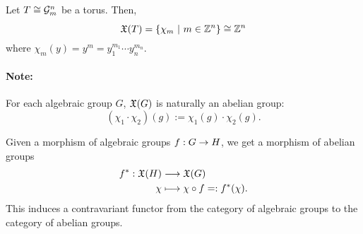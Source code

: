 \begin{example}
Let $T \overset{}{\cong} \mathcal{G}_m^n$ be a torus. Then,
\[ \mathfrak{X}(T) = \left\lbrace\chi_m ~ | ~ m \in \mathbb{Z}^n\right\rbrace \overset{}{\cong} \mathbb{Z}^n \]
where $\chi_m(y) = y^m = y_1^{m_1}\cdots y_n^{m_n}.$
\end{example}
\paragraph{Note:} For each algebraic group $G$, $\mathfrak{X}(G)$ is naturally an abelian group:
\[ (\chi_1 \cdot \chi_2)(g) := \chi_1(g) \cdot \chi_2(g). \]


Given a morphism of algebraic groups $f : G \overset{}{\rightarrow} H$, we get a morphism of abelian groups
\begin{align*}
f^* : \mathfrak{X}(H) & \overset{}{\longrightarrow} \mathfrak{X}(G)\\
\chi & \longmapsto \chi \circ f =: f^*(\chi).
\end{align*}
This induces a contravariant functor from the category of algebraic groups to the category of abelian groups.

